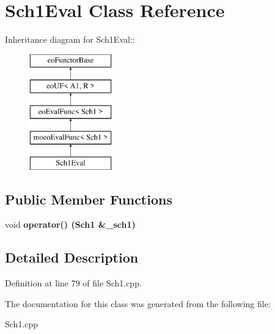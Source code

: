 \section{Sch1Eval Class Reference}
\label{classSch1Eval}
Inheritance diagram for Sch1Eval::\begin{figure}[H]
\begin{center}
\leavevmode
\includegraphics[height=5cm]{classSch1Eval}
\end{center}
\end{figure}
\subsection*{Public Member Functions}
\begin{CompactItemize}
\item 
void \bf{operator()} (\bf{Sch1} \&\_\-sch1)\label{classSch1Eval_4f806a964f7bafa9e4fcca45da458c98}

\end{CompactItemize}


\subsection{Detailed Description}




Definition at line 79 of file Sch1.cpp.

The documentation for this class was generated from the following file:\begin{CompactItemize}
\item 
Sch1.cpp\end{CompactItemize}
